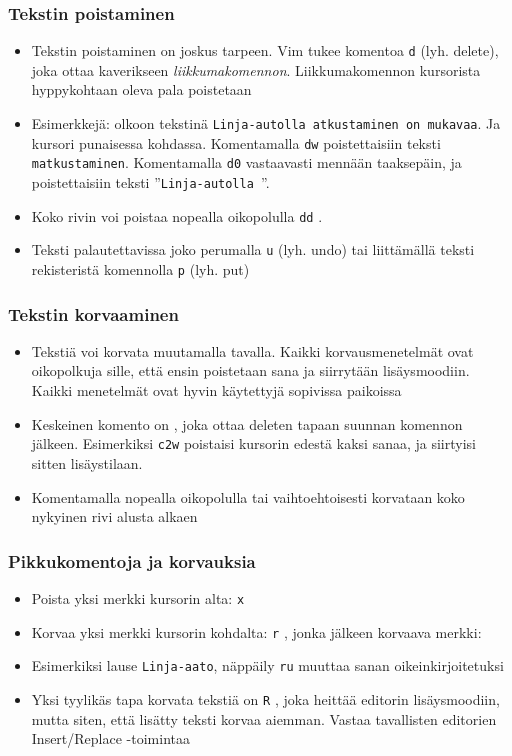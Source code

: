 \documentclass[]{beamer}
\newcommand{\Tohj}[1]{\texttt{#1}}
\newcommand{\com}[1]{{\color{blue!50!black}\Tohj{#1}} \!\!}
\begin{document}
\begin{frame}
    \frametitle{Tekstin poistaminen}
    \begin{itemize}
        \item Tekstin poistaminen on joskus tarpeen. Vim tukee komentoa \com{d} (lyh. delete), joka ottaa kaverikseen \emph{liikkumakomennon}. Liikkumakomennon kursorista hyppykohtaan oleva pala poistetaan
        \item Esimerkkejä: olkoon tekstinä \texttt{Linja-autolla {\color{red}{m}}atkustaminen on mukavaa}. Ja kursori punaisessa kohdassa. Komentamalla \com{dw} poistettaisiin teksti \texttt{matkustaminen}. Komentamalla \com{d0} vastaavasti mennään taaksepäin, ja poistettaisiin teksti ''\texttt{Linja-autolla }''.
        \pause
        \item Koko rivin voi poistaa nopealla oikopolulla \com{dd}.
        \item Teksti palautettavissa joko perumalla \com{u} (lyh. undo) tai liittämällä teksti rekisteristä komennolla \com{p} (lyh. put)
    \end{itemize}
\end{frame}

\begin{frame}
    \frametitle{Tekstin korvaaminen}
    \begin{itemize}
        \item Tekstiä voi korvata muutamalla tavalla. Kaikki korvausmenetelmät ovat oikopolkuja sille, että ensin poistetaan sana ja siirrytään lisäysmoodiin. Kaikki menetelmät ovat hyvin käytettyjä sopivissa paikoissa
        \item Keskeinen komento on {\color<2>{red}{\com{c} (lyh. change)}}, joka ottaa deleten tapaan suunnan komennon jälkeen. Esimerkiksi \com{c2w} poistaisi kursorin edestä kaksi sanaa, ja siirtyisi sitten lisäystilaan.
        \item Komentamalla nopealla oikopolulla {\color<3>{red}{\com{cc} }} tai vaihtoehtoisesti {\color<3>{red}{\com{S} (lyh. substitute)}} korvataan koko nykyinen rivi alusta alkaen
    \end{itemize}
\end{frame}

\begin{frame}
    \frametitle{Pikkukomentoja ja korvauksia}
    \begin{itemize}
        \item Poista yksi merkki kursorin alta: \com{x}
        \pause
        \item Korvaa yksi merkki kursorin kohdalta: \com{r}, jonka jälkeen korvaava merkki:
        \item Esimerkiksi lause \texttt{Linja-a{\color{red}a}to}, näppäily \com{ru} muuttaa sanan oikeinkirjoitetuksi
        \pause
        \item Yksi tyylikäs tapa korvata tekstiä on \com{R}, joka heittää editorin lisäysmoodiin, mutta siten, että lisätty teksti korvaa aiemman. Vastaa tavallisten editorien Insert/Replace -toimintaa
    \end{itemize}
\end{frame}
\end{document}
